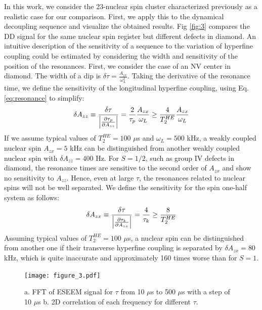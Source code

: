 \documentclass[%
 reprint,
superscriptaddress,
 amsmath,amssymb,
 aps,
]{revtex4-2}
\begin{document}
In this work, we consider the 23-nuclear spin cluster characterized previously \cite{abobeih2019atomic} as a realistic case for our comparison.
First, we apply this to the dynamical decoupling sequence and visualize the obtained results. Fig \ref{fig:3} compares the DD signal for the same nuclear spin register but different defects in diamond.
An intuitive description of the sensitivity of a sequence to the variation of hyperfine coupling could be estimated by considering the width and sensitivity of the position of the resonances.
First, we consider the case of an NV center in diamond. The width of a dip is $\delta \tau = \frac{A_{zx}}{\omega_L^2}$. Taking the derivative of the resonance time, we define the sensitivity of the longitudinal hyperfine coupling, using Eq. \ref{eq:resonance} to simplify:
\begin{gather}
	\delta A_{zz} \equiv \frac{\delta \tau}{\abs{\frac{\partial \tau_p}{\partial A_{zz}}}} = \frac{2}{\tau_p} \frac{A_{zx}}{\omega_L} \ge \frac{4}{T_2^{HE}} \frac{A_{zx}}{\omega_L}
\end{gather}
If we assume typical values of $T_2^{HE} = 100$ $\mu$s and $\omega_L=500$ kHz, a weakly coupled nuclear spin $A_{zx}=5$ kHz can be distinguished from another weakly coupled nuclear spin with $\delta A_{zz} = 400$ Hz.
For $S=1/2$, such as group IV defects in diamond, the resonance times are sensitive to the second order of $A_{zx}$ and show no sensitivity to $A_{zz}$.
Hence, even at large $\tau$, the resonances related to nuclear spins will not be well separated.
We define the sensitivity for the spin one-half system as follows:
\begin{gather}
	\delta A_{zx} \equiv \frac{\delta \tau}{\abs{\frac{\partial \tau_k}{\partial A_{zx}}}} = \frac{4}{\tau_k} \ge \frac{8}{T_2^{HE}}
\end{gather}
Assuming typical values of $T_2^{HE} = 100$ $\mu$s, a nuclear spin can be distinguished from another one if their transverse hyperfine coupling is separated by $\delta A_{zx} = 80$ kHz, which is quite inaccurate and approximately 160 times worse than for $S=1$.
\begin{figure}%
	\begin{center}
		\texttt{[image: figure\_3.pdf]}
		\caption{a. FFT of ESEEM signal for $\tau$ from 10 $\mu$s to 500 $\mu$s with a step of 10 $\mu$s b. 2D correlation of each frequency for different $\tau$.}
		\label{fig:4}
	\end{center}
\end{figure}
\end{document}

